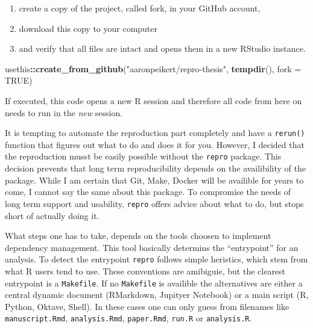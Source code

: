\documentclass[12pt,a4paper,]{article}
\newenvironment{Shaded}{\begin{snugshade}}{\end{snugshade}}
\newcommand{\DataTypeTok}[1]{\textcolor[rgb]{0.13,0.29,0.53}{#1}}
\newcommand{\KeywordTok}[1]{\textcolor[rgb]{0.13,0.29,0.53}{\textbf{#1}}}
\newcommand{\NormalTok}[1]{#1}
\newcommand{\OperatorTok}[1]{\textcolor[rgb]{0.81,0.36,0.00}{\textbf{#1}}}
\newcommand{\OtherTok}[1]{\textcolor[rgb]{0.56,0.35,0.01}{#1}}
\newcommand{\StringTok}[1]{\textcolor[rgb]{0.31,0.60,0.02}{#1}}
\providecommand{\tightlist}{%
  \setlength{\itemsep}{0pt}\setlength{\parskip}{0pt}}
\begin{document}
\begin{enumerate}
\def\labelenumi{\arabic{enumi}.}
\tightlist
\item
  create a copy of the project, called fork, in your GitHub account,
\item
  download this copy to your computer
\item
  and verify that all files are intact and opens them in a new RStudio instance.
\end{enumerate}

\begin{Shaded}
\begin{Highlighting}[]
\NormalTok{usethis}\OperatorTok{::}\KeywordTok{create_from_github}\NormalTok{(}\StringTok{"aaronpeikert/repro-thesis"}\NormalTok{,}
                            \KeywordTok{tempdir}\NormalTok{(),}
                            \DataTypeTok{fork =} \OtherTok{TRUE}\NormalTok{)}
\end{Highlighting}
\end{Shaded}

If executed, this code opens a new R session and therefore all code from here on needs to run in the \emph{new} session.

It is tempting to automate the reproduction part completely and have a \texttt{rerun()} function that figures out what to do and does it for you.
However, I decided that the reproduction musst be easily possible without the \texttt{repro} package.
This decision prevents that long term reproducibility depends on the availibility of the package.
While I am certain that Git, Make, Docker will be availible for years to come, I cannot say the same about this package.
To compromise the needs of long term support and usability, \texttt{repro} offers advice about what to do, but stops short of actually doing it.

What steps one has to take, depends on the tools choosen to implement dependency management.
This tool basically determins the ``entrypoint'' for an analysis.
To detect the entrypoint \texttt{repro} follows simple heristics, which stem from what R users tend to use.
These conventions are amibiguie, but the clearest entrypoint is a \texttt{Makefile}.
If no \texttt{Makefile} is availible the alternatives are either a central dynamic document (RMarkdown, Jupityer Notebook) or a main script (R, Python, Oktave, Shell).
In these cases one can only guess from filenames like \texttt{manuscript.Rmd}, \texttt{analysis.Rmd}, \texttt{paper.Rmd}, \texttt{run.R} or \texttt{analysis.R}.
\end{document}
